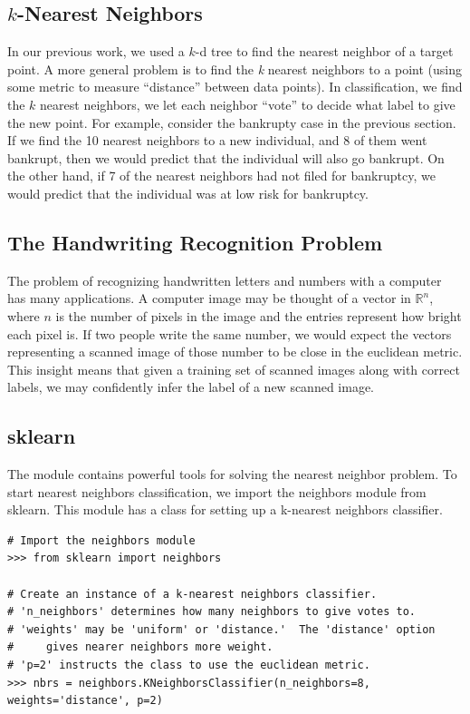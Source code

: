\subsection*{$k$-Nearest Neighbors} %

In our previous work, we used a $k$-d tree to find the nearest neighbor of a target point.
A more general problem is to find the \emph{k} nearest neighbors to a point (using some metric to measure ``distance'' between data points).
In classification, we find the $k$ nearest neighbors, we let each neighbor ``vote'' to decide what label to give the new point.
For example, consider the bankrupty case in the previous section.
If we find the 10 nearest neighbors to a new individual, and 8 of them went bankrupt, then we would predict that the individual will also go bankrupt.
On the other hand, if 7 of the nearest neighbors had not filed for bankruptcy, we would predict that the individual was at low risk for bankruptcy.

\subsection*{The Handwriting Recognition Problem} %

The problem of recognizing handwritten letters and numbers with a computer has many applications.
A computer image may be thought of a vector in $\mathbb{R}^n$, where $n$ is the number of pixels in the image and the entries represent how bright each pixel is.
If two people write the same number, we would expect the vectors representing a scanned image of those number to be close in the euclidean metric.
This insight means that given a training set of scanned images along with correct labels, we may confidently infer the label of a new scanned image.

\subsection*{sklearn} %

The  module contains powerful tools for solving the nearest neighbor problem.
To start nearest neighbors classification, we import the neighbors module from sklearn.
This module has a class for setting up a k-nearest neighbors classifier.
\begin{lstlisting}
# Import the neighbors module
>>> from sklearn import neighbors

# Create an instance of a k-nearest neighbors classifier.
# 'n_neighbors' determines how many neighbors to give votes to.
# 'weights' may be 'uniform' or 'distance.'  The 'distance' option
#     gives nearer neighbors more weight.
# 'p=2' instructs the class to use the euclidean metric.
>>> nbrs = neighbors.KNeighborsClassifier(n_neighbors=8, weights='distance', p=2)
\end{lstlisting}

